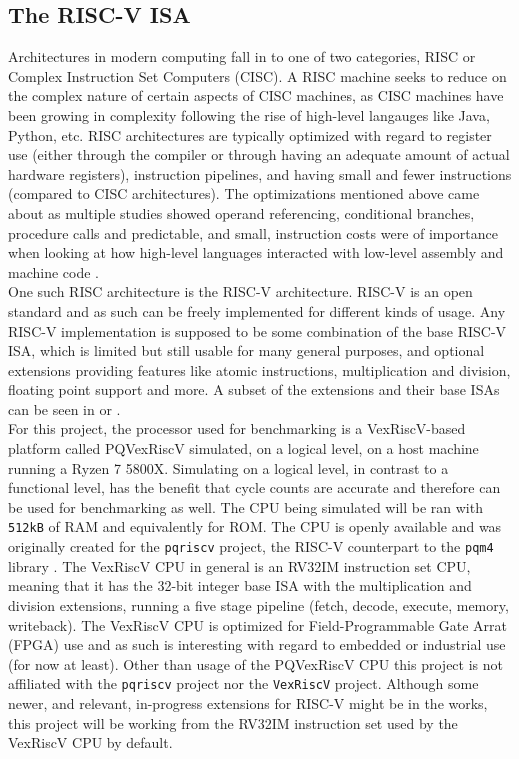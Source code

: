 \subsection{The RISC-V ISA} \label{pre-riscv}
Architectures in modern computing fall in to one of two categories, RISC or Complex Instruction Set Computers (CISC). A RISC machine seeks to reduce on the complex nature of certain aspects of CISC machines, as CISC machines have been growing in complexity following the rise of high-level langauges like Java, Python, etc. RISC architectures are typically optimized with regard to register use (either through the compiler or through having an adequate amount of actual hardware registers), instruction pipelines, and having small and fewer instructions (compared to CISC architectures). The optimizations mentioned above came about as multiple studies showed operand referencing, conditional branches, procedure calls and predictable, and small, instruction costs were of importance when looking at how high-level languages interacted with low-level assembly and machine code \cite{stallings}.
\medskip\\
One such RISC architecture is the RISC-V architecture. RISC-V is an open standard and as such can be freely implemented for different kinds of usage. Any RISC-V implementation is supposed to be some combination of the base RISC-V ISA, which is limited but still usable for many general purposes, and optional extensions providing features like atomic instructions, multiplication and division, floating point support and more. A subset of the extensions and their base ISAs can be seen in \cite{riscvmodular} or \cite{riscdesign}.
\medskip\\
For this project, the processor used for benchmarking is a VexRiscV-based platform called PQVexRiscV simulated, on a logical level, on a host machine running a Ryzen 7 5800X. Simulating on a logical level, in contrast to a functional level, has the benefit that cycle counts are accurate and therefore can be used for benchmarking as well. The CPU being simulated will be ran with \texttt{512kB} of RAM and equivalently for ROM. The CPU is openly available and was originally created for the \texttt{pqriscv} project, the RISC-V counterpart to the \texttt{pqm4} library \cite{pqvex}. The VexRiscV CPU in general is an RV32IM instruction set CPU, meaning that it has the 32-bit integer base ISA with the multiplication and division extensions, running a five stage pipeline (fetch, decode, execute, memory, writeback). The VexRiscV CPU is optimized for Field-Programmable Gate Arrat (FPGA) use \cite{vexriscv} and as such is interesting with regard to embedded or industrial use (for now at least). Other than usage of the PQVexRiscV CPU this project is not affiliated with the \texttt{pqriscv} project nor the \texttt{VexRiscV} project. Although some newer, and relevant, in-progress extensions for RISC-V might be in the works, this project will be working from the RV32IM instruction set used by the VexRiscV CPU by default.